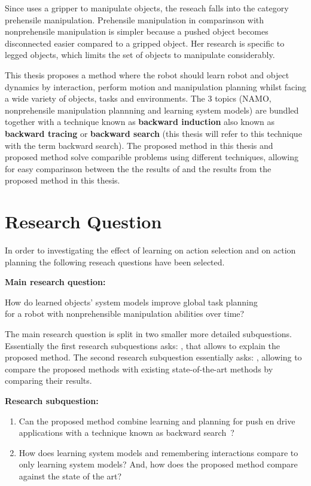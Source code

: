 Since \citeauthor{sabbaghnovin_model_2021} uses a gripper to manipulate objects, the reseach falls into the category prehensile manipulation. Prehensile manipulation in comparinson with nonprehensile manipulation is simpler because a pushed object becomes disconnected easier compared to a gripped object. Her research is specific to legged objects, which limits the set of objects to manipulate considerably.\bs

This thesis proposes a method where the robot should learn robot and object dynamics by interaction, perform motion and manipulation planning whilst facing a wide variety of objects, tasks and environments. The 3 topics (\ac{NAMO}, nonprehensile manipulation plannning and learning system models) are bundled together with a technique known as \textbf{backward induction} also known as \textbf{backward tracing} or \textbf{backward search} (this thesis will refer to this technique with the term backward search). The proposed method in this thesis and \citeauthor{sabbaghnovin_model_2021} proposed method solve comparible problems using different techniques, allowing for easy comparinson between the the results of \citeauthor{sabbaghnovin_model_2021} and the results from the proposed method in this thesis.\bs

\section{Research Question}%
\label{sec:research_question}
In order to investigating the effect of learning on action selection and on action planning the following reseach questions have been selected.\bs

\textbf{Main research question:}
\begin{center}%
\label{researchquestion:main}
\large
How do learned objects' system models improve global task planning\\for a robot with nonprehensible manipulation abilities over time?
\end{center} 

The main research question is split in two smaller more detailed subquestions. Essentially the first research subquestions asks: , that allows to explain the proposed method. The second research subquestion essentially asks: , allowing to compare the proposed methods with existing state-of-the-art methods by comparing their results.\bs

\textbf{Research subquestion:}
\begin{enumerate}
    \item\label{researchsubquestion:does_it_work} Can the proposed method combine learning and planning for push en drive applications with a technique known as backward search~\cite{krontiris_dealing_2015}?
    \item\label{researchsubquestion:does_it_compare} How does learning system models and remembering interactions compare to only learning system models? And, how does the proposed method compare against the state of the art? 
\end{enumerate}

